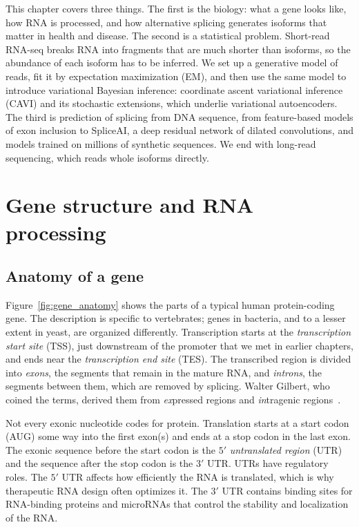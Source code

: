 This chapter covers three things. The first is the biology: what a gene looks like, how RNA is processed, and how alternative splicing generates isoforms that matter in health and disease. The second is a statistical problem. Short-read RNA-seq breaks RNA into fragments that are much shorter than isoforms, so the abundance of each isoform has to be inferred. We set up a generative model of reads, fit it by expectation maximization (EM), and then use the same model to introduce variational Bayesian inference: coordinate ascent variational inference (CAVI) and its stochastic extensions, which underlie variational autoencoders. The third is prediction of splicing from DNA sequence, from feature-based models of exon inclusion to SpliceAI, a deep residual network of dilated convolutions, and models trained on millions of synthetic sequences. We end with long-read sequencing, which reads whole isoforms directly.

\section{Gene structure and RNA processing}
\label{sec:gene_structure}

\subsection{Anatomy of a gene}

Figure~\ref{fig:gene_anatomy} shows the parts of a typical human protein-coding gene. The description is specific to vertebrates; genes in bacteria, and to a lesser extent in yeast, are organized differently. Transcription starts at the \emph{transcription start site} (TSS), just downstream of the promoter that we met in earlier chapters, and ends near the \emph{transcription end site} (TES). The transcribed region is divided into \emph{exons}, the segments that remain in the mature RNA, and \emph{introns}, the segments between them, which are removed by splicing. Walter Gilbert, who coined the terms, derived them from \emph{ex}pressed regions and \emph{in}tragenic regions~\citep{gilbert1978}.

Not every exonic nucleotide codes for protein. Translation starts at a start codon (AUG) some way into the first exon(s) and ends at a stop codon in the last exon. The exonic sequence before the start codon is the $5'$ \emph{untranslated region} (UTR) and the sequence after the stop codon is the $3'$ UTR. UTRs have regulatory roles. The $5'$ UTR affects how efficiently the RNA is translated, which is why therapeutic RNA design often optimizes it. The $3'$ UTR contains binding sites for RNA-binding proteins and microRNAs that control the stability and localization of the RNA.

